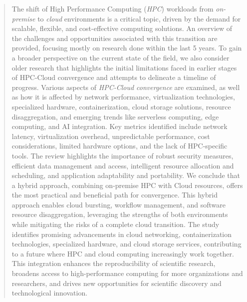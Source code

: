 \documentclass[sigconf,review]{acmart}
\newcommand{\todo}[1]{\textcolor{blue}{\uline{#1}}}
\begin{document}
%
\begin{abstract}


    The shift of High Performance Computing (\textit{HPC}) workloads from \textit{on-premise} to \textit{cloud} environments is a critical topic, driven by the demand for scalable, flexible, and cost-effective computing solutions. An overview of the challenges and opportunities associated with this transition are provided, focusing mostly on research done within the last 5 years. To gain a broader perspective on the current state of the field, we also consider older research that highlights the initial limitations faced in earlier stages of HPC-Cloud convergence and attempts to delineate a timeline of progress.
    Various aspects of \textit{HPC-Cloud convergence} are examined, as well as how it is affected by network performance, virtualization technologies, specialized hardware, containerization, cloud storage solutions, resource disaggregation, and emerging trends like serverless computing, edge computing, and AI integration. Key metrics identified include network latency, virtualization overhead, unpredictable performance, cost considerations, limited hardware options, and the lack of HPC-specific tools. The review highlights the importance of robust security measures, efficient data management and access, intelligent resource allocation and scheduling, and application adaptability and portability.
    We conclude that a hybrid approach, combining on-premise HPC with Cloud resources, offers the most practical and beneficial path for convergence. This hybrid approach enables cloud bursting, workflow management, and software resource disaggregation, leveraging the strengths of both environments while mitigating the risks of a complete cloud transition. The study identifies promising advancements in cloud networking, containerization technologies, specialized hardware, and cloud storage services, contributing to a future where HPC and cloud computing increasingly work together. This integration enhances the reproducibility of scientific research, broadens access to high-performance computing for more organizations and researchers, and drives new opportunities for scientific discovery and technological innovation.



\end{abstract}
\end{document}
